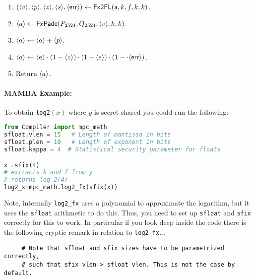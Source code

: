 \begin{enumerate}
\item $(\langle v \rangle,\langle p \rangle,\langle z \rangle,\langle s \rangle,\langle \mathsf{err} \rangle)
	\leftarrow \mathsf{Fx2FL}(\mathsf{a},k,f,k,k)$.
\item $\langle a \rangle \leftarrow \mathsf{FxPade}(P_{2524},Q_{2524},\langle v \rangle,k,k)$.
\item $\langle a \rangle \leftarrow \langle a \rangle+\langle p \rangle$.
\item $\langle a \rangle \leftarrow \langle a \rangle \cdot (1-\langle z \rangle) \cdot (1-\langle s \rangle) \cdot (1-\cdot \langle \mathsf{err} \rangle)$.
\item Return $\langle a \rangle$.
\end{enumerate}

\paragraph{MAMBA Example:} To obtain \verb|log2|$(x)$ where $y$ is secret shared you could run the following: 
\begin{lstlisting}[language={python}]
from Compiler import mpc_math
sfloat.vlen = 15   # Length of mantissa in bits
sfloat.plen = 10   # Length of exponent in bits
sfloat.kappa = 4  # Statistical security parameter for floats

x =sfix(4)
# extracts k and f from y
# returns log_2(4) 
log2_x=mpc_math.log2_fx(sfix(x))
\end{lstlisting}
Note, internally \verb+log2_fx+ uses a polynomial to approximate the logarithm, but it uses the \verb+sfloat+ arithmetic to do this.
Thus, you need to set up \verb+sfloat+ and \verb+sfix+ correctly for this to work.
In particular if you look deep inside the code there is the following cryptic remark in relation to \verb+log2_fx+...
\begin{verbatim}
     # Note that sfloat and sfix sizes have to be parametrized correctly,
     # such that sfix vlen > sfloat vlen. This is not the case by default. 
\end{verbatim}


